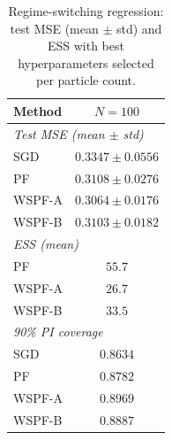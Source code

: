\begin{table}[t]
\centering
\caption{Regime-switching regression: test MSE (mean $\pm$ std) and ESS with best hyperparameters selected per particle count.}
\label{tab:regression_regime_switch}
\small
\renewcommand{\arraystretch}{1.15}
\begin{tabular}{@{}lc@{}}
\toprule
Method & $N=100$ \\
\midrule
\multicolumn{2}{l}{\textit{Test MSE (mean $\pm$ std)}} \\
SGD & $0.3347 \pm 0.0556$ \\
PF & $0.3108 \pm 0.0276$ \\
WSPF-A & $0.3064 \pm 0.0176$ \\
WSPF-B & $0.3103 \pm 0.0182$ \\
\midrule
\multicolumn{2}{l}{\textit{ESS (mean)}} \\
PF & $55.7$ \\
WSPF-A & $26.7$ \\
WSPF-B & $33.5$ \\
\midrule
\multicolumn{2}{l}{\textit{90\% PI coverage}} \\
SGD & $0.8634$ \\
PF & $0.8782$ \\
WSPF-A & $0.8969$ \\
WSPF-B & $0.8887$ \\
\bottomrule
\end{tabular}
\end{table}
